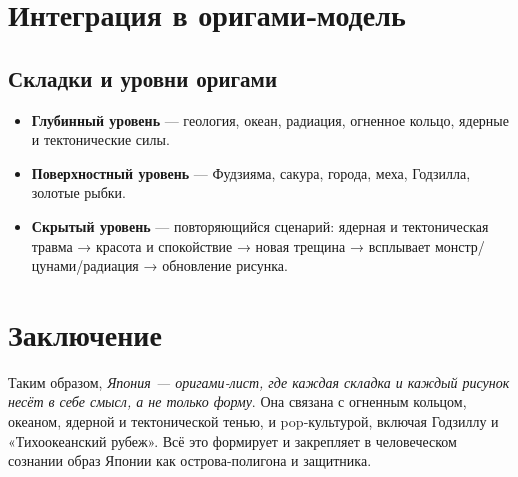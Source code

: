 \documentclass[12pt]{article}
\begin{document}
\section{Интеграция в оригами‑модель}

\subsection{Складки и уровни оригами}

\begin{itemize}
  \item \textbf{Глубинный уровень} — геология, океан, радиация, огненное кольцо, ядерные и тектонические силы.
  \item \textbf{Поверхностный уровень} — Фудзияма, сакура, города, меха, Годзилла, золотые рыбки.
  \item \textbf{Скрытый уровень} — повторяющийся сценарий: ядерная и тектоническая травма → красота и спокойствие → новая трещина → всплывает монстр/цунами/радиация → обновление рисунка.
\end{itemize}

\section{Заключение}

Таким образом, \emph{Япония — оригами‑лист, где каждая складка и каждый рисунок несёт в себе смысл, а не только форму}. Она связана с огненным кольцом, океаном, ядерной и тектонической тенью, и pop‑культурой, включая Годзиллу и «Тихоокеанский рубеж». Всё это формирует и закрепляет в человеческом сознании образ Японии как острова‑полигона и защитника.
\end{document}
